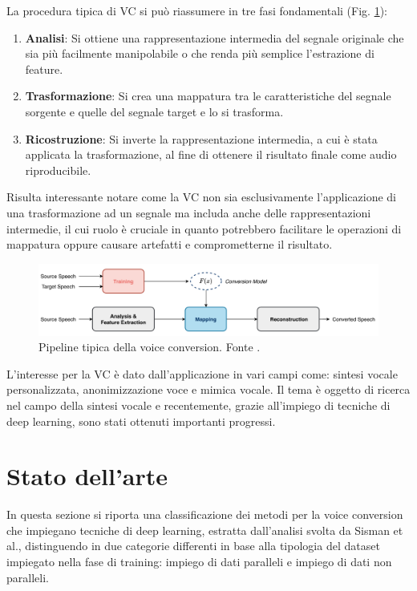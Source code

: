 			La procedura tipica di VC si può riassumere in tre fasi fondamentali (Fig. \ref{fig:vc-pipeline})\cite{voice-conversion-overview}:
			\begin{enumerate}
				\item \textbf{Analisi}: Si ottiene una rappresentazione intermedia del segnale originale che sia più facilmente manipolabile o che renda più semplice l'estrazione di feature.
				\item \textbf{Trasformazione}: Si crea una mappatura tra le caratteristiche del segnale sorgente e quelle del segnale target e lo si trasforma.
				\item \textbf{Ricostruzione}: Si inverte la rappresentazione intermedia, a cui è stata applicata la trasformazione, al fine di ottenere il risultato finale come audio riproducibile.
			\end{enumerate}
			Risulta interessante notare come la VC non sia esclusivamente l'applicazione di una trasformazione ad un segnale ma includa anche delle rappresentazioni intermedie, il cui ruolo è cruciale in quanto potrebbero facilitare le operazioni di mappatura oppure causare artefatti e comprometterne il risultato.
			\begin{figure}%
				\centering
				\includegraphics[width=1\linewidth]{figures/vc-pipeline}
				\caption{Pipeline tipica della voice conversion. Fonte \cite{voice-conversion-overview}.}
				\label{fig:vc-pipeline}
			\end{figure}
			L’interesse per la VC è dato dall’applicazione in vari campi come: sintesi vocale personalizzata, anonimizzazione voce e mimica vocale.
			Il tema è oggetto di ricerca nel campo della sintesi vocale e recentemente, grazie all’impiego di tecniche di deep learning, sono stati ottenuti importanti progressi. 
	
		\section{Stato dell'arte}
			In questa sezione si riporta una classificazione dei metodi per la voice conversion che impiegano tecniche di deep learning, estratta dall'analisi svolta da Sisman et al.\cite{voice-conversion-overview}, distinguendo in due categorie differenti in base alla tipologia del dataset impiegato nella fase di training: impiego di dati paralleli e impiego di dati non paralleli.
			
